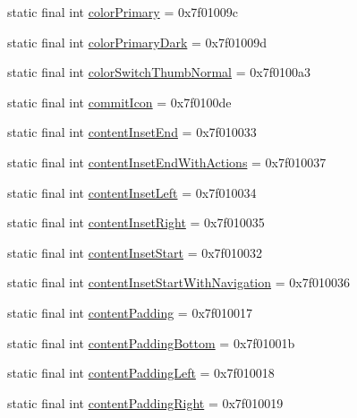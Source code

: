 \begin{CompactItemize}
static final int \hyperlink{classandroid_1_1support_1_1v7_1_1cardview_1_1_r_1_1attr_757ff3bb29ecab552bcf0ad4f9ac7631}{colorPrimary} = 0x7f01009c
\item 
static final int \hyperlink{classandroid_1_1support_1_1v7_1_1cardview_1_1_r_1_1attr_c184e1bd698d808e0e55ce0ba202af73}{colorPrimaryDark} = 0x7f01009d
\item 
static final int \hyperlink{classandroid_1_1support_1_1v7_1_1cardview_1_1_r_1_1attr_e86e068c2c05eb4d51173d9a5f10608c}{colorSwitchThumbNormal} = 0x7f0100a3
\item 
static final int \hyperlink{classandroid_1_1support_1_1v7_1_1cardview_1_1_r_1_1attr_1b7c70e754d3be1551ba1f15848960a4}{commitIcon} = 0x7f0100de
\item 
static final int \hyperlink{classandroid_1_1support_1_1v7_1_1cardview_1_1_r_1_1attr_87d6b305f9f8edf14864f95c1bfc5ee5}{contentInsetEnd} = 0x7f010033
\item 
static final int \hyperlink{classandroid_1_1support_1_1v7_1_1cardview_1_1_r_1_1attr_834d70596f8dc323caf0ae9a298c2bb5}{contentInsetEndWithActions} = 0x7f010037
\item 
static final int \hyperlink{classandroid_1_1support_1_1v7_1_1cardview_1_1_r_1_1attr_ae57c05de2e8f6a0567e79055ae4d984}{contentInsetLeft} = 0x7f010034
\item 
static final int \hyperlink{classandroid_1_1support_1_1v7_1_1cardview_1_1_r_1_1attr_a8f34cefc05c09cbdca29557807fb16e}{contentInsetRight} = 0x7f010035
\item 
static final int \hyperlink{classandroid_1_1support_1_1v7_1_1cardview_1_1_r_1_1attr_b367a637f46d5b03063b163a03f78f72}{contentInsetStart} = 0x7f010032
\item 
static final int \hyperlink{classandroid_1_1support_1_1v7_1_1cardview_1_1_r_1_1attr_32bf03a5f3de77b1c91a560319b49b20}{contentInsetStartWithNavigation} = 0x7f010036
\item 
static final int \hyperlink{classandroid_1_1support_1_1v7_1_1cardview_1_1_r_1_1attr_f7f315eef8c265cff6e1c45418671b12}{contentPadding} = 0x7f010017
\item 
static final int \hyperlink{classandroid_1_1support_1_1v7_1_1cardview_1_1_r_1_1attr_5a9688b9bba95e88ca45b1c8256e22b2}{contentPaddingBottom} = 0x7f01001b
\item 
static final int \hyperlink{classandroid_1_1support_1_1v7_1_1cardview_1_1_r_1_1attr_bb0d43620767ddf0f0698491c1278877}{contentPaddingLeft} = 0x7f010018
\item 
static final int \hyperlink{classandroid_1_1support_1_1v7_1_1cardview_1_1_r_1_1attr_3578ef1146679345c7a93b29a88d918e}{contentPaddingRight} = 0x7f010019

\end{CompactItemize}
